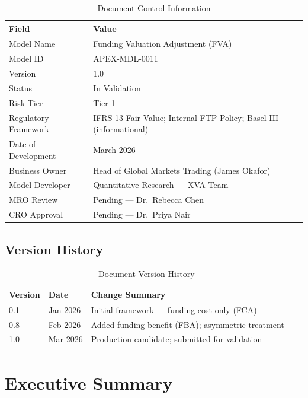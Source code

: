 \documentclass[11pt,a4paper]{article}
\begin{document}
\begin{table}[h!]
\centering
\caption{Document Control Information}
\begin{tabular}{@{}ll@{}}
\toprule
\textbf{Field} & \textbf{Value} \\
\midrule
Model Name            & Funding Valuation Adjustment (FVA) \\
Model ID              & APEX-MDL-0011 \\
Version               & 1.0 \\
Status                & In Validation \\
Risk Tier             & Tier 1 \\
Regulatory Framework  & IFRS 13 Fair Value; Internal FTP Policy; Basel III (informational) \\
Date of Development   & March 2026 \\
Business Owner        & Head of Global Markets Trading (James Okafor) \\
Model Developer       & Quantitative Research --- XVA Team \\
MRO Review            & Pending --- Dr.\ Rebecca Chen \\
CRO Approval          & Pending --- Dr.\ Priya Nair \\
\bottomrule
\end{tabular}
\end{table}

\subsection{Version History}

\begin{table}[h!]
\centering
\caption{Document Version History}
\begin{tabular}{@{}lll@{}}
\toprule
\textbf{Version} & \textbf{Date} & \textbf{Change Summary} \\
\midrule
0.1 & Jan 2026 & Initial framework --- funding cost only (FCA) \\
0.8 & Feb 2026 & Added funding benefit (FBA); asymmetric treatment \\
1.0 & Mar 2026 & Production candidate; submitted for validation \\
\bottomrule
\end{tabular}
\end{table}

\section{Executive Summary}
\end{document}
